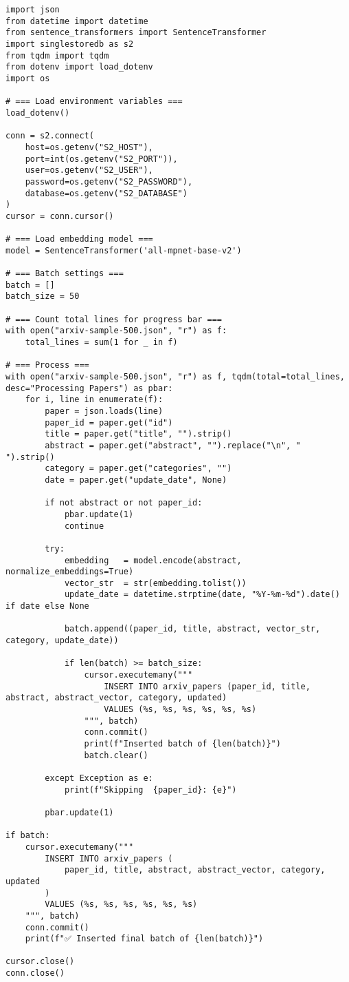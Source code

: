 \documentclass[11pt]{article}
\begin{document}
\begin{verbatim}
import json
from datetime import datetime
from sentence_transformers import SentenceTransformer
import singlestoredb as s2
from tqdm import tqdm
from dotenv import load_dotenv
import os

# === Load environment variables ===
load_dotenv()

conn = s2.connect(
    host=os.getenv("S2_HOST"),
    port=int(os.getenv("S2_PORT")),
    user=os.getenv("S2_USER"),
    password=os.getenv("S2_PASSWORD"),
    database=os.getenv("S2_DATABASE")
)
cursor = conn.cursor()

# === Load embedding model ===
model = SentenceTransformer('all-mpnet-base-v2')

# === Batch settings ===
batch = []
batch_size = 50

# === Count total lines for progress bar ===
with open("arxiv-sample-500.json", "r") as f:
    total_lines = sum(1 for _ in f)

# === Process ===
with open("arxiv-sample-500.json", "r") as f, tqdm(total=total_lines, desc="Processing Papers") as pbar:
    for i, line in enumerate(f):
        paper = json.loads(line)
        paper_id = paper.get("id")
        title = paper.get("title", "").strip()
        abstract = paper.get("abstract", "").replace("\n", " ").strip()
        category = paper.get("categories", "")
        date = paper.get("update_date", None)

        if not abstract or not paper_id:
            pbar.update(1)
            continue

        try:
            embedding   = model.encode(abstract, normalize_embeddings=True)
            vector_str  = str(embedding.tolist())
            update_date = datetime.strptime(date, "%Y-%m-%d").date() if date else None

            batch.append((paper_id, title, abstract, vector_str, category, update_date))

            if len(batch) >= batch_size:
                cursor.executemany("""
                    INSERT INTO arxiv_papers (paper_id, title, abstract, abstract_vector, category, updated)
                    VALUES (%s, %s, %s, %s, %s, %s)
                """, batch)
                conn.commit()
                print(f"Inserted batch of {len(batch)}")
                batch.clear()

        except Exception as e:
            print(f"Skipping  {paper_id}: {e}")

        pbar.update(1)

if batch:
    cursor.executemany("""
        INSERT INTO arxiv_papers (
            paper_id, title, abstract, abstract_vector, category, updated
        )
        VALUES (%s, %s, %s, %s, %s, %s)
    """, batch)
    conn.commit()
    print(f"✅ Inserted final batch of {len(batch)}")

cursor.close()
conn.close()

\end{verbatim}
\end{document}
